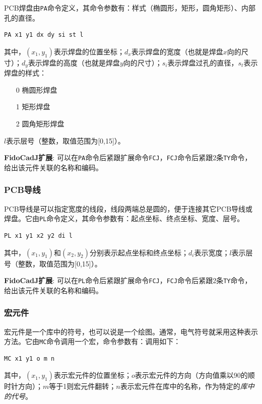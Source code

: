 \documentclass[10pt,a4paper,twoside]{scrreprt}
\begin{document}
PCB焊盘由\lstinline!PA!命令定义，其命令参数有：样式（椭圆形，矩形，圆角矩形）、内部孔的直径。
\begin{lstlisting}
PA x1 y1 dx dy si st l 
\end{lstlisting} 
其中，$(x_{1},y_{1})$表示焊盘的位置坐标；$d_{x}$表示焊盘的宽度（也就是焊盘$x$向的尺寸）；$d_{y}$表示焊盘的高度（也就是焊盘$y$向的尺寸）；$s_{i}$表示焊盘过孔的直径，$s_{t}$表示焊盘的样式：
\begin{itemize}
\item [0] 椭圆形焊盘
\item [1] 矩形焊盘
\item [2] 圆角矩形焊盘
\end{itemize}
$l$表示层号（整数，取值范围为[0,15]）。

\textbf{FidoCadJ扩展}: 可以在\lstinline!PA!命令后紧跟扩展命令\lstinline!FCJ!，\lstinline!FCJ!命令后紧跟2条\lstinline!TY!命令，给出该元件关联的名称和编码。

\subsubsection{PCB导线}

PCB导线是可以指定宽度的线段，线段两端总是圆的，便于连接其它PCB导线或焊盘。它由\lstinline!PL!命令定义，其命令参数有：起点坐标、终点坐标、宽度、层号。
\begin{lstlisting} 
PL x1 y1 x2 y2 di l 
\end{lstlisting}
其中，$(x_{1},y_{1})$和$(x_{2},y_{2})$分别表示起点坐标和终点坐标；$d_{i}$表示宽度；$l$表示层号（整数，取值范围为[0,15]）。

\textbf{FidoCadJ扩展}: 可以在\lstinline!PL!命令后紧跟扩展命令\lstinline!FCJ!，\lstinline!FCJ!命令后紧跟2条\lstinline!TY!命令，给出该元件关联的名称和编码。

\subsubsection{宏元件}

宏元件是一个库中的符号，也可以说是一个绘图。通常，电气符号就采用这种表示方法。它由\lstinline!MC!命令调用一个宏，命令参数有：调用如下：
\begin{lstlisting} 
MC x1 y1 o m n 
\end{lstlisting} 
其中，$(x_{1},y_{1})$表示宏元件的位置坐标；$o$表示宏元件的方向（方向值乘以90\textdegree{}的顺时针方向）；$m$等于1则宏元件翻转；$n$表示宏元件在库中的名称，作为特定的\emph{库中的代号}。
\end{document}
